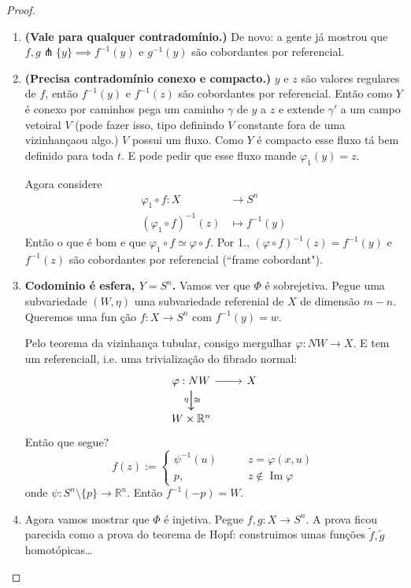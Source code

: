 \begin{proof}\leavevmode
\begin{enumerate}
\item \textbf{(Vale para qualquer contradomínio.)} De novo: a gente já mostrou que \(f,g \pitchfork  \{y\}\implies f^{-1}(y)\) e \(g^{-1}(y)\) são cobordantes por referencial.
\item \textbf{(Precisa contradomínio conexo e compacto.)} \(y\) e \(z\) são valores regulares de \(f\), então \(f^{-1}(y)\) e \(f^{-1}(z)\) são cobordantes por referencial. Então como \(Y\) é conexo por caminhos pega um caminho \(\gamma\) de \(y\) a \(z\)  e extende \(\gamma'\) a um campo vetoiral \(V\) (pode fazer isso, tipo definindo  \(V\) constante fora de uma vizinhançaou algo.) \(V\) possui um fluxo. Como \(Y\) é compacto esse fluxo tá bem definido para toda \(t\). E pode pedir que esse fluxo mande \(\varphi_1(y)=z\).

	Agora considere
	\begin{align*}
		\varphi_1 \circ f: X &\longrightarrow S^n \\
		(\varphi_1 \circ f)^{-1}(z) &\longmapsto f^{-1}(y)
	\end{align*}
Então o que é bom e que \(\varphi_1 \circ f \simeq \varphi \circ f\). Por 1., \((\varphi \circ f)^{-1}(z)=f^{-1}(y)\) e \(f^{-1}(z)\) são cobordantes por referencial (``frame cobordant").

\item \textbf{Codominio é esfera, \(Y=S^{n}\).} Vamos ver que \(\Phi\)  é sobrejetiva. Pegue uma subvariedade \((W,\eta)\) uma subvariedade referenial de \(X\) de dimensão \(m-n\). Queremos uma fun ção \(f: X \to S^n\) com \(f^{-1}(y)=w\).

	Pelo teorema da vizinhança tubular, consigo mergulhar \(\varphi: NW \to X\). E tem um referenciall, i.e. uma trivialização do fibrado normal:
	\[\begin{tikzcd}
		\varphi: NW \arrow[ r]\arrow[d,"\cong"]\arrow[d,"\eta",swap]&  X\\
		W \times \mathbb{R}^n
	\end{tikzcd}\]
Então que segue?
\[f(z):=\begin{cases}
	\psi^{-1}(u)\qquad &z=\varphi(x,u) \\
	p,\qquad &z \not \in \operatorname{Im}\varphi
\end{cases}\]
onde \(\psi:S^n\setminus \{p\}\to \mathbb{R}^n\). Então \(f^{-1}(-p)=W\).

\item Agora vamos mostrar que \(\Phi\) é injetiva. Pegue \(f,g: X \to S^n\). A prova ficou parecida como a prova do teorema de Hopf: construimos umas funções \(\tilde{f}, \tilde{g}\) homotópicas…
\end{enumerate}
\end{proof}

